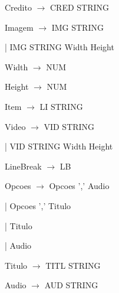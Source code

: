 \documentclass[11pt,a4paper]{report}
\begin{document}
\vspace{0.2cm}
\hspace{1.0cm} Credito $\rightarrow$ CRED STRING

\vspace{0.2cm}
\hspace{1.0cm} Imagem $\rightarrow$ IMG STRING

\vspace{0.2cm}
\hspace{2.65cm} | IMG STRING Width Height

\vspace{0.2cm}
\hspace{1.0cm} Width $\rightarrow$ NUM

\vspace{0.2cm}
\hspace{1.0cm} Height $\rightarrow$ NUM

\vspace{0.2cm}
\hspace{1.0cm} Item $\rightarrow$ LI STRING

\vspace{0.2cm}
\hspace{1.0cm} Video $\rightarrow$ VID STRING

\vspace{0.2cm}
\hspace{2.3cm} | VID STRING Width Height 

\vspace{0.2cm}
\hspace{1.0cm} LineBreak $\rightarrow$ LB 

\vspace{0.2cm}
\hspace{1.0cm} Opcoes $\rightarrow$ Opcoes ',' Audio

\vspace{0.2cm}
\hspace{2.6cm} | Opcoes ',' Titulo

\vspace{0.2cm}
\hspace{2.6cm} | Titulo

\vspace{0.2cm}
\hspace{2.6cm} | Audio

\vspace{0.2cm}
\hspace{1.0cm} Titulo $\rightarrow$ TITL STRING 

\vspace{0.2cm}
\hspace{1.0cm} Audio $\rightarrow$ AUD STRING 
\end{document}
